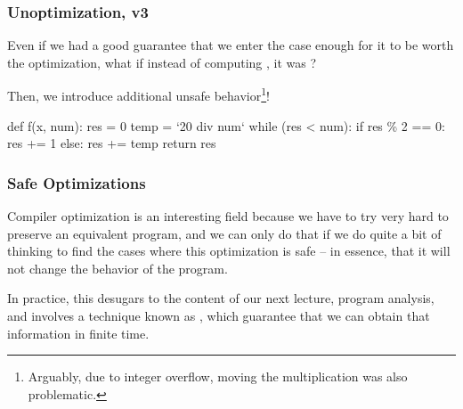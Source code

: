 \documentclass[aspectratio=169]{beamer}
\begin{document}
\begin{frame}[fragile]
  \frametitle{Unoptimization, v3}

  Even if we had a good guarantee that we enter the  case
  enough for it to be worth the optimization, what if instead of computing
  , it was ?

  \vspace{\fill}

  Then, we introduce additional unsafe behavior\footnote{Arguably,
  due to integer overflow, moving the multiplication was also
  problematic.}!

  \pause
  \vspace{\fill}

  \begin{pythoncodeblock}
    def f(x, num):
      res = 0
      temp = `20 div num`
      while (res < num):
        if res \% 2 == 0:
          res += 1
        else:
          res += temp
      return res
  \end{pythoncodeblock}
\end{frame}

\begin{frame}[fragile]
  \frametitle{Safe Optimizations}

  \ptmt

  Compiler optimization is an interesting field because we have to try
  very hard to preserve an equivalent program, and we can only do that if
  we do quite a bit of thinking to find the cases where this optimization is safe --
  in essence, that it will not change the behavior of the program.

  \pause
  \vspace{\fill}


  \pause
  \vspace{\fill}

  In practice, this desugars to the content of our next lecture, program analysis,
  and involves a technique known as , which guarantee
  that we can obtain that information in finite time.
\end{frame}
\end{document}
